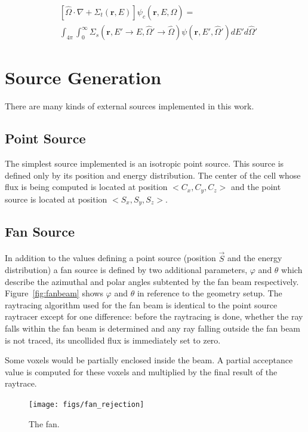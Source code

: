 \begin{equation} \label{eq:col3}
\begin{split}
	&\left[ \hat{\Omega} \cdot \nabla + \Sigma_t(\boldsymbol{r}, E) \right]
	\psi_c(\boldsymbol{r}, E, \hat{\Omega}) = \\
	&\int_{4 \pi} \int_0^\infty \Sigma_s(\boldsymbol{r}, E' \rightarrow E, \hat{\Omega}' \rightarrow \hat{\Omega}) \psi(\boldsymbol{r}, E', \hat{\Omega}') dE' d\hat{\Omega}'
\end{split}
\end{equation}

\section{Source Generation}
There are many kinds of external sources implemented in this work.

\subsection{Point Source}
The simplest source implemented is an isotropic point source. This source is defined only by its position and energy distribution. The center of the cell whose flux is being computed is located at position $<C_x, C_y, C_z>$ and the point source is located at position $<S_x, S_y, S_z>$.

\subsection{Fan Source}
In addition to the values defining a point source (position $\vec{S}$ and the energy distribution) a fan source is defined by two additional parameters, $\varphi$ and $\theta$ which describe the azimuthal and polar angles subtented by the fan beam respectively. Figure~\ref{fig:fanbeam} shows $\varphi$ and $\theta$ in reference to the geometry setup. The raytracing algorithm used for the fan beam is identical to the point source raytracer except for one difference: before the raytracing is done, whether the ray falls within the fan beam is determined and any ray falling outside the fan beam is not traced, its uncollided flux is immediately set to zero.

Some voxels would be partially enclosed inside the beam. A partial acceptance value is computed for these voxels and multiplied by the final result of the raytrace.

\begin{figure}[tb]
  \begin{center}
   \texttt{[image: figs/fan\_rejection]}
  \end{center}
  \caption{The fan.}
\label{fig:fan_rejection}
\end{figure}

